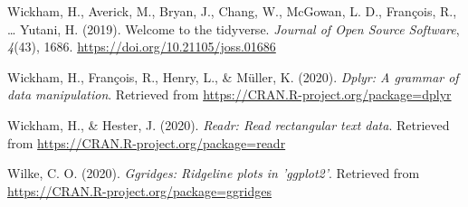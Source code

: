 \documentclass[
  english,
  man]{apa6}
\newlength{\cslhangindent}
\newenvironment{cslreferences}%
  {\setlength{\parindent}{0pt}%
  \everypar{\setlength{\hangindent}{\cslhangindent}}\ignorespaces}%
  {\par}
\begin{document}
\begin{cslreferences}
\leavevmode\hypertarget{ref-R-tidyverse}{}%
Wickham, H., Averick, M., Bryan, J., Chang, W., McGowan, L. D., François, R., \ldots{} Yutani, H. (2019). Welcome to the tidyverse. \emph{Journal of Open Source Software}, \emph{4}(43), 1686. \url{https://doi.org/10.21105/joss.01686}

\leavevmode\hypertarget{ref-R-dplyr}{}%
Wickham, H., François, R., Henry, L., \& Müller, K. (2020). \emph{Dplyr: A grammar of data manipulation}. Retrieved from \url{https://CRAN.R-project.org/package=dplyr}

\leavevmode\hypertarget{ref-R-readr}{}%
Wickham, H., \& Hester, J. (2020). \emph{Readr: Read rectangular text data}. Retrieved from \url{https://CRAN.R-project.org/package=readr}

\leavevmode\hypertarget{ref-R-ggridges}{}%
Wilke, C. O. (2020). \emph{Ggridges: Ridgeline plots in 'ggplot2'}. Retrieved from \url{https://CRAN.R-project.org/package=ggridges}
\end{cslreferences}

\endgroup
\end{document}
